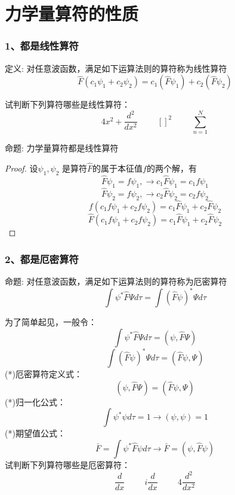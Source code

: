 \section{力学量算符的性质}

\begin{frame} [allowframebreaks=]
    \frametitle{1、都是线性算符}
    \begin{tcolorbox1}{定义:}
        对任意波函数，满足如下运算法则的算符称为线性算符\\
        $$\hat{F}(c_1\psi_1+c_2\psi_2 ) = c_1(\hat{F}\psi_1)+c_2(\hat{F}\psi_2 )$$
    \end{tcolorbox1}
    试判断下列算符哪些是线性算符：\\
    $$4x^2+\frac{d^2}{dx^2} \hspace{1cm}  []^2 \hspace{1cm} \sum\limits_{n=1}^{N}$$
\end{frame} 

\begin{frame} [allowframebreaks=]
    \begin{tcolorbox1}{命题:}
      力学量算符都是线性算符  
    \end{tcolorbox1}
    \begin{proof}
        设$\psi_1, \psi_2$ 是算符$\hat{F}$的属于本征值$f$的两个解，有\\
        $$\hat{F}\psi_1=f\psi_1, \to c_1\hat{F}\psi_1=c_1f\psi_1 $$
        $$\hat{F}\psi_2=f\psi_2, \to c_2\hat{F}\psi_2=c_2f\psi_2 $$
        $$f(c_1f\psi_1+c_2f\psi_2)=c_1\hat{F}\psi_1+c_2\hat{F}\psi_2$$
        $$\hat{F}(c_1f\psi_1+c_2f\psi_2)=c_1\hat{F}\psi_1+c_2\hat{F}\psi_2$$
    \end{proof}
\end{frame} 

\begin{frame} [allowframebreaks=]
    \frametitle{2、都是厄密算符}
    \begin{tcolorbox1}{命题:}
    对任意波函数，满足如下运算法则的算符称为厄密算符\\
        $$\int \psi^* \hat{F} \Psi d\tau =\int (\hat{F}\psi)^* \Psi d\tau $$
    \end{tcolorbox1}
    为了简单起见，一般令： $$\int \psi^* \hat{F} \Psi d\tau= (\psi,\hat{F}\Psi)$$
    $$\int (\hat{F}\psi)^* \Psi d\tau = (\hat{F}\psi,\Psi) $$
    (*)厄密算符定义式： $$(\psi,\hat{F}\Psi)= (\hat{F}\psi,\Psi) $$
    (*)归一化公式： $$ \int \psi^{*} \psi d \tau=1 \to (\psi,\psi)=1$$
    (*)期望值公式： $$ \bar{F}=\int \psi^{*} \hat{F} \psi d \tau \to \bar{F}= (\psi,\hat{F}\psi) $$
    试判断下列算符哪些是厄密算符：\\
    $$\frac{d}{dx} \hspace{1cm}  i\frac{d}{dx} \hspace{1cm} 4\frac{d^2}{dx^2} $$
\end{frame} 

